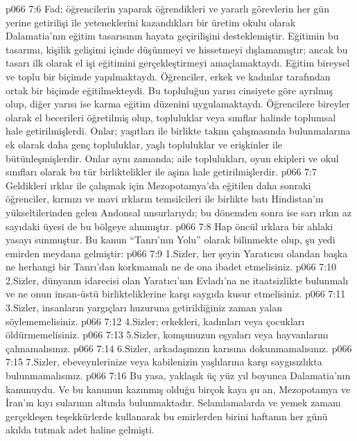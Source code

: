 \vs p066 7:6 Fad; öğrencilerin yaparak öğrendikleri ve yararlı görevlerin her gün yerine getirilişi ile yeteneklerini kazandıkları bir üretim okulu olarak Dalamatia’nın eğitim tasarısının hayata geçirilişini desteklemiştir. Eğitimin bu tasarımı, kişilik gelişimi içinde düşünmeyi ve hissetmeyi dışlamamıştır; ancak bu tasarı ilk olarak el işi eğitimini gerçekleştirmeyi amaçlamaktaydı. Eğitim bireysel ve toplu bir biçimde yapılmaktaydı. Öğrenciler, erkek ve kadınlar tarafından ortak bir biçimde eğitilmekteydi. Bu topluluğun yarısı cinsiyete göre ayrılmış olup, diğer yarısı ise karma eğitim düzenini uygulamaktaydı. Öğrencilere bireyler olarak el becerileri öğretilmiş olup, topluluklar veya sınıflar halinde toplumsal hale getirilmişlerdi. Onlar; yaşıtları ile birlikte takım çalışmasında bulunmalarına ek olarak daha genç topluluklar, yaşlı topluluklar ve erişkinler ile bütünleşmişlerdir. Onlar aynı zamanda; aile toplulukları, oyun ekipleri ve okul sınıfları olarak bu tür birliktelikler ile aşina hale getirilmişlerdir.
\vs p066 7:7 Geldikleri ırklar ile çalışmak için Mezopotamya’da eğitilen daha sonraki öğrenciler, kırmızı ve mavi ırkların temsilcileri ile birlikte batı Hindistan’ın yükseltilerinden gelen Andonsal unsurlarıydı; bu dönemden sonra ise sarı ırkın az sayıdaki üyesi de bu bölgeye alınmıştır.
\vs p066 7:8 Hap öncül ırklara bir ahlaki yasayı sunmuştur. Bu kanun “Tanrı’nın Yolu” olarak bilinmekte olup, şu yedi emirden meydana gelmiştir:
\vs p066 7:9 1.\bibnobreakspace Sizler, her şeyin Yaratıcısı olandan başka ne herhangi bir Tanrı’dan korkmamalı ne de ona ibadet etmelisiniz.
\vs p066 7:10 2.\bibnobreakspace Sizler, dünyanın idarecisi olan Yaratıcı’nın Evladı’na ne itaatsizlikte bulunmalı ve ne onun insan\hyp{}üstü birlikteliklerine karşı saygıda kusur etmelisiniz.
\vs p066 7:11 3.\bibnobreakspace Sizler, insanların yargıçları huzuruna getirildiğiniz zaman yalan söylememelisiniz.
\vs p066 7:12 4.\bibnobreakspace Sizler; erkekleri, kadınları veya çocukları öldürmemelisiniz.
\vs p066 7:13 5.\bibnobreakspace Sizler, komşunuzun eşyaları veya hayvanlarını çalmamalısınız.
\vs p066 7:14 6.\bibnobreakspace Sizler, arkadaşınızın karısına dokunmamalısınız.
\vs p066 7:15 7.\bibnobreakspace Sizler, ebeveynlerinize veya kabilenizin yaşlılarına karşı saygısızlıkta bulunmamalısınız.
\vs p066 7:16 Bu yasa, yaklaşık üç yüz yıl boyunca Dalamatia’nın kanunuydu. Ve bu kanunun kazınmış olduğu birçok kaya şu an, Mezopotamya ve İran’ın kıyı sularının altında bulunmaktadır. Selamlamalarda ve yemek zamanı gerçekleşen teşekkürlerde kullanarak bu emirlerden birini haftanın her günü akılda tutmak adet haline gelmişti.
